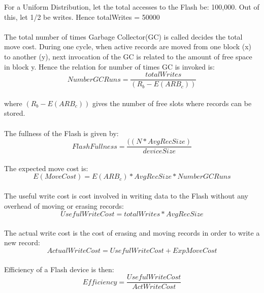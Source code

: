 \documentclass[11pt]{report} %
\begin{document}
For a Uniform Distribution, let the total accesses to the Flash be: 100,000. Out of this, let 1/2 be writes. Hence totalWrites = 50000\\
\\

The total number of times  Garbage Collector(GC) is called decides the total move cost. During one cycle, when active records are moved from one block (x) to another (y), next invocation of the GC is related to the amount of free space in block y. Hence the relation for number of times GC is invoked is:\\
\begin{equation}NumberGCRuns = \frac{totalWrites}{(R_b - E(ARB_c))}\end{equation}\\
where ${(R_b - E(ARB_c))}$ gives the number of free slots where records can be stored.\\
\\

The fullness of the Flash is given by:
\begin{equation}FlashFullness = \frac{((N * AvgRecSize)}{deviceSize}\end{equation}\\

The expected move cost is:
\begin{equation}E(MoveCost) = E(ARB_c) * AvgRecSize * NumberGCRuns\end{equation}\\

The useful write cost is cost involved in writing data to the Flash without any overhead of moving or erasing records: \begin{equation}UsefulWriteCost = totalWrites * AvgRecSize\end{equation}\\

The actual write cost is the cost of erasing and moving records in order to write a new record:
\begin{equation}ActualWriteCost = UsefulWriteCost + ExpMoveCost\end{equation}\\

Efficiency of a Flash device is then:
\begin{equation}Efficiency = \frac{UsefulWriteCost}{ActWriteCost}\end{equation}\\

\end{document}
